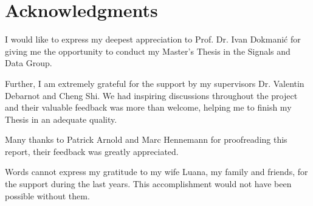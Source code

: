 \chapter{Acknowledgments}

I would like to express my deepest appreciation to Prof. Dr. Ivan Dokmanić
for giving me the opportunity to conduct my Master's Thesis in the 
Signals and Data Group.

\bigskip

Further, I am extremely grateful for the support by my supervisors
Dr. Valentin Debarnot and Cheng Shi. We had inspiring discussions
throughout the project and their valuable feedback was more than welcome,
helping me to finish my Thesis in an adequate quality.

\bigskip
Many thanks to Patrick Arnold and Marc Hennemann for 
proofreading this report, their feedback was greatly appreciated.

\bigskip
Words cannot express my gratitude to my wife Luana, my family and friends,
for the support during the last years.
This accomplishment would not have been possible without them.